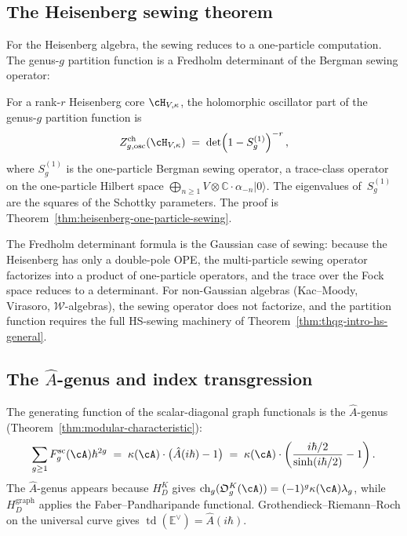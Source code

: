 \subsection{The Heisenberg sewing theorem}
\label{subsec:thqg-intro-heisenberg-sewing}

For the Heisenberg algebra, the sewing reduces to a one-particle
computation. The genus-$g$ partition function is a Fredholm
determinant of the Bergman sewing operator:

\begin{theorem}
\label{thm:thqg-intro-heisenberg-sewing}
For a rank-$r$ Heisenberg core $\cH_{V,\kappa}$, the holomorphic
oscillator part of the genus-$g$ partition function is
\begin{equation}\label{eq:thqg-intro-heisenberg-fredholm}
Z^{\mathrm{ch}}_{g,\mathrm{osc}}(\cH_{V,\kappa})
\;=\;
\det\!\left(1 - S^{(1)}_g\right)^{-r},
\end{equation}
where $S^{(1)}_g$ is the one-particle Bergman sewing operator,
a trace-class operator on the one-particle Hilbert space
$\bigoplus_{n \ge 1} V\otimes\mathbb{C}\cdot\alpha_{-n}|0\rangle$.
The eigenvalues of~$S^{(1)}_g$ are the squares of the Schottky
parameters. The proof is
Theorem~\textup{\ref{thm:heisenberg-one-particle-sewing}}.
\end{theorem}

The Fredholm determinant formula is the Gaussian case of sewing:
because the Heisenberg has only a double-pole OPE, the
multi-particle sewing operator factorizes into a product of
one-particle operators, and the trace over the Fock space reduces to
a determinant. For non-Gaussian algebras (Kac--Moody, Virasoro,
$\mathcal{W}$-algebras), the sewing operator does not factorize, and
the partition function requires the full HS-sewing machinery of
Theorem~\ref{thm:thqg-intro-hs-general}.

\subsection{The $\hat{A}$-genus and index transgression}
\label{subsec:thqg-intro-ahat-transgression}

The generating function of the scalar-diagonal graph functionals is the
$\hat{A}$-genus
(Theorem~\ref{thm:modular-characteristic}):
\begin{equation}\label{eq:thqg-intro-ahat-generating}
\sum_{g \ge 1}
F_g^{\mathrm{sc}}(\cA) \hbar^{2g}
\;=\;
\kappa(\cA) \cdot \bigl(\hat{A}(i\hbar) - 1\bigr)
\;=\;
\kappa(\cA) \cdot
\left(\frac{i\hbar/2}{\sinh(i\hbar/2)} - 1\right).
\end{equation}
The $\hat{A}$-genus appears because $H_D^K$ gives
$\operatorname{ch}_g(\mathfrak O_g^K(\cA))=
(-1)^g\kappa(\cA)\lambda_g$, while $H_D^{\mathrm{graph}}$ applies the
Faber--Pandharipande functional.  Grothendieck--Riemann--Roch on the
universal curve gives
$\operatorname{td}(\mathbb{E}^\vee)=\hat{A}(i\hbar)$.

